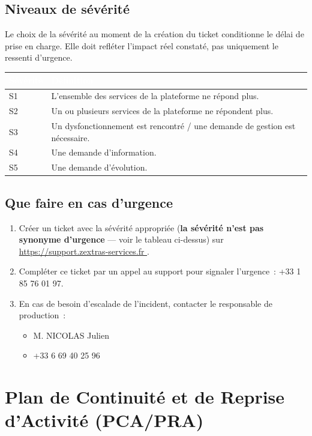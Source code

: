 \documentclass[11pt,a4paper]{report}
\newcommand{\tblhead}[1]{\textcolor{white}{\textbf{#1}}}
\begin{document}
\section{Niveaux de sévérité}
Le choix de la sévérité au moment de la création du ticket conditionne le délai de prise en charge. Elle doit refléter l'impact réel constaté, pas uniquement le ressenti d'urgence.

\begin{longtable}{|p{1.3cm}|p{11cm}|}
\hline
\rowcolor{primary}\tblhead{Sévérité} & \tblhead{Définition} \\
\hline
\endhead
S1 & L'ensemble des services de la plateforme ne répond plus. \\
\hline
S2 & Un ou plusieurs services de la plateforme ne répondent plus. \\
\hline
S3 & Un dysfonctionnement est rencontré / une demande de gestion est nécessaire. \\
\hline
S4 & Une demande d'information. \\
\hline
S5 & Une demande d'évolution. \\
\hline
\end{longtable}

\section{Que faire en cas d'urgence}
\begin{enumerate}[nosep]
  \item Créer un ticket avec la sévérité appropriée (\textbf{la sévérité n'est pas synonyme d'urgence} --- voir le tableau ci-dessus) sur \url{https://support.zextras-services.fr }.
  \item Compléter ce ticket par un appel au support pour signaler l'urgence~: +33 1 85 76 01 97.
  \item En cas de besoin d'escalade de l'incident, contacter le responsable de production~:
  \begin{itemize}[nosep]
    \item M.\allowbreak{} NICOLAS Julien
    \item +33 6 69 40 25 96
  \end{itemize}
\end{enumerate}

\chapter{Plan de Continuité et de Reprise d'Activité (PCA/PRA)}
\label{sec:pca-pra}
\end{document}
